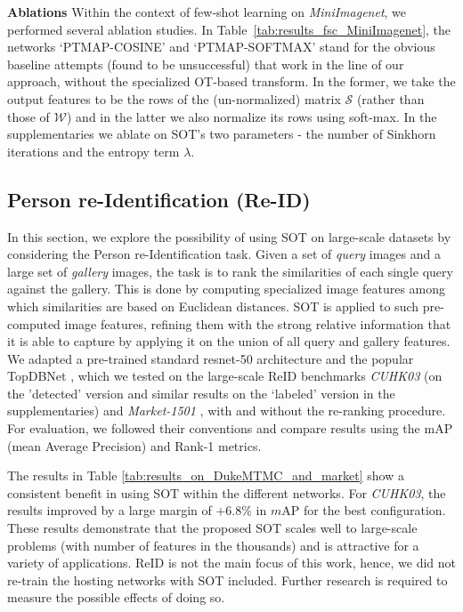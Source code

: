 \vspace{3pt}\noindent\textbf{Ablations} Within the context of few-shot learning on \emph{MiniImagenet}, we performed several ablation studies. In Table~\ref{tab:results_fsc_MiniImagenet}, the networks `PTMAP-COSINE' and `PTMAP-SOFTMAX' stand for the obvious baseline attempts (found to be unsuccessful) that work in the line of our approach, without the specialized OT-based transform. In the former, we take the output features to be the rows of the (un-normalized) matrix  $\mathcal{S}$ (rather than those of  $\mathcal{W}$) and in the latter we also normalize its rows using soft-max.
In the supplementaries we ablate on SOT's two parameters - the number of Sinkhorn iterations and the entropy term $\lambda$. 


\subsection{Person re-Identification (Re-ID)}
In this section, we explore the possibility of using SOT on large-scale datasets by considering the Person re-Identification task. 
Given a set of \textit{query} images and a large set of \textit{gallery} images, the task is to rank the similarities of each single query against the gallery. This is done by computing specialized image features among which similarities are based on Euclidean distances. SOT is applied to such pre-computed image features, refining them with the strong relative information that it is able to capture by applying it on the union of all query and gallery features. We adapted a pre-trained standard resnet-50 architecture \cite{torchreid} and the popular TopDBNet \cite{Top-DB-Net}, which we tested on the large-scale ReID benchmarks \emph{CUHK03} \cite{CUHK03} (on the 'detected' version and similar results on the `labeled' version in the supplementaries) and \textit{Market-1501} \cite{Market}, with and without the re-ranking \cite{Re-ranking} procedure. For evaluation, we followed their conventions and compare results using the mAP (mean Average Precision) and Rank-1 metrics.

The results in Table \ref{tab:results_on_DukeMTMC_and_market} show a consistent benefit in using SOT within the different networks. For \emph{CUHK03}, the results improved by a large margin of $+6.8\%$ in $m$AP for the best configuration. These results demonstrate that the proposed SOT scales well to large-scale problems (with number of features in the  thousands) and is attractive for a variety of applications. 
ReID is not the main focus of this work, hence, we did not re-train the hosting networks with SOT included. Further research is required to measure the possible effects of doing so.

